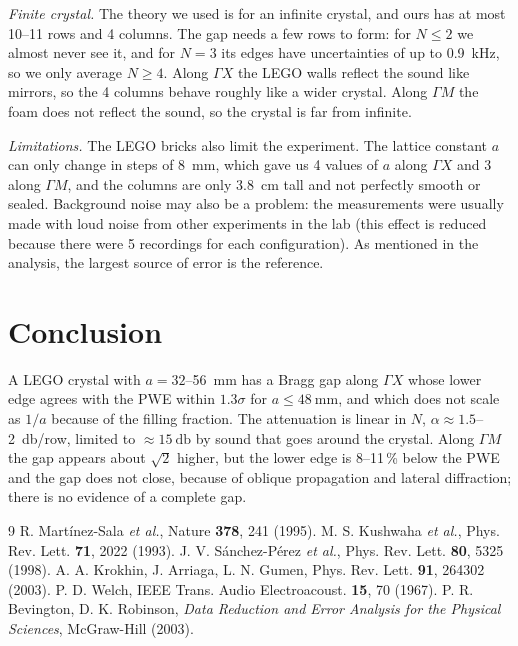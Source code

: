 \documentclass[9pt,a4paper,twocolumn]{extarticle}
\newcommand{\umm}{\milli\metre}
\newcommand{\ucm}{\centi\metre}
\newcommand{\ukHz}{\kilo\hertz}
\newcommand{\udB}{\decibel}
\newcommand{\GX}{\ensuremath{\Gamma X}}
\newcommand{\GM}{\ensuremath{\Gamma M}}
\begin{document}
\emph{Finite crystal.} The theory we used is for an infinite crystal, and ours has at most 10--11 rows and 4 columns. The gap needs a few rows to form: for $N\le2$ we almost never see it, and for $N=3$ its edges have uncertainties of up to \SI{0.9}{\ukHz}, so we only average $N\ge4$. Along \GX{} the LEGO walls reflect the sound like mirrors, so the 4 columns behave roughly like a wider crystal. Along \GM{} the foam does not reflect the sound, so the crystal is far from infinite.

\emph{Limitations.} The LEGO bricks also limit the experiment. The lattice constant $a$ can only change in steps of \SI{8}{\umm}, which gave us 4 values of $a$ along \GX{} and 3 along \GM, and the columns are only \SI{3.8}{\ucm} tall and not perfectly smooth or sealed. Background noise may also be a problem: the measurements were usually made with loud noise from other experiments in the lab (this effect is reduced because there were 5 recordings for each configuration). As mentioned in the analysis, the largest source of error is the reference.

\section{Conclusion}
A LEGO crystal with $a=32$--\SI{56}{\umm} has a Bragg gap along \GX{} whose lower edge agrees with the PWE within $1.3\sigma$ for $a\le\SI{48}{\umm}$, and which does not scale as $1/a$ because of the filling fraction. The attenuation is linear in $N$, $\alpha\approx1.5$--\SI{2}{\udB}/row, limited to $\approx\SI{15}{\udB}$ by sound that goes around the crystal. Along \GM{} the gap appears about $\sqrt2$ higher, but the lower edge is 8--11\,\% below the PWE and the gap does not close, because of oblique propagation and lateral diffraction; there is no evidence of a complete gap.

\begin{thebibliography}{9}\footnotesize
\setlength{\itemsep}{1pt}
 R. Martínez-Sala \emph{et al.}, Nature \textbf{378}, 241 (1995).
 M. S. Kushwaha \emph{et al.}, Phys. Rev. Lett. \textbf{71}, 2022 (1993).
 J. V. Sánchez-Pérez \emph{et al.}, Phys. Rev. Lett. \textbf{80}, 5325 (1998).
 A. A. Krokhin, J. Arriaga, L. N. Gumen, Phys. Rev. Lett. \textbf{91}, 264302 (2003).
 P. D. Welch, IEEE Trans. Audio Electroacoust. \textbf{15}, 70 (1967).
 P. R. Bevington, D. K. Robinson, \emph{Data Reduction and Error Analysis for the Physical Sciences}, McGraw-Hill (2003).
\end{thebibliography}
\end{document}
